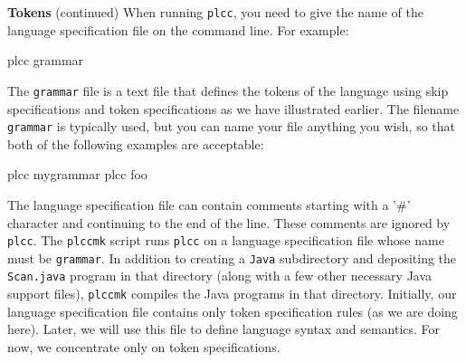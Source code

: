 \begin{minipage}[t]{\sw}
\slidenumber
\LARGE
{\bf Tokens} (continued)\exx
When running \verb'plcc', you need to give the name
of the language specification file on the command line.
For example:
\begin{qv}
plcc grammar
\end{qv}
The \verb'grammar' file is a text file
that defines the tokens of the language
using skip specifications and token specifications
as we have illustrated earlier.
The filename \verb'grammar' is typically used,
but you can name your file anything you wish,
so that both of the following examples are acceptable:
\begin{qv}
plcc mygrammar
plcc foo
\end{qv}
The language specification file can contain
comments starting with a '\#' character
and continuing to the end of the line.
These comments are ignored by \verb'plcc'.\exx
The \verb'plccmk' script runs \verb'plcc'
on a language specification file
whose name must be \verb'grammar'.
In addition to creating a \verb'Java' subdirectory
and depositing the \verb'Scan.java' program in that directory
(along with a few other necessary Java support files),
\verb'plccmk' compiles the Java programs in that directory.
Initially, our language specification file contains only
token specification rules (as we are doing here).
Later, we will use this file to define language syntax and semantics.
For now, we concentrate only on token specifications.

\end{minipage}
\clearpage

